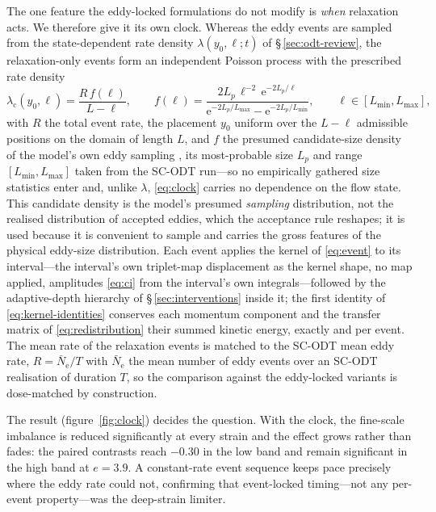 \documentclass[lineno]{JFM-FLM_Au}
\begin{document}
The one feature the eddy-locked formulations do not modify is \emph{when} relaxation acts. We therefore give it its own clock. Whereas the eddy
events are sampled from the state-dependent rate density
$\lambda(y_0,\ell;t)$ of \S\,\ref{sec:odt-review}, the relaxation-only
events form an independent Poisson process with the prescribed rate
density
\begin{equation}
  \lambda_{\mathrm c}(y_0,\ell)
  = \frac{R\,f(\ell)}{L-\ell},
  \qquad
  f(\ell)
  = \frac{2L_p\,\ell^{-2}\,\mathrm{e}^{-2L_p/\ell}}
         {\mathrm{e}^{-2L_p/L_{\max}}-\mathrm{e}^{-2L_p/L_{\min}}},
  \qquad \ell\in[L_{\min},L_{\max}],
  \label{eq:clock}
\end{equation}
with $R$ the total event rate, the placement $y_0$ uniform over the
$L-\ell$ admissible positions on the domain of length $L$, and $f$ the
presumed candidate-size density of the model's own eddy sampling
\citep{Kerstein1999,StephensLignell2021}, its most-probable size $L_p$
and range $[L_{\min},L_{\max}]$ taken from the SC-ODT run---so no
empirically gathered size statistics enter and, unlike $\lambda$,
\eqref{eq:clock} carries no dependence on the flow state. This candidate density is the model's presumed \emph{sampling} distribution, not the realised distribution of accepted eddies, which the acceptance rule reshapes; it is used because it is convenient to sample and carries the gross features of the physical eddy-size distribution. Each event applies the kernel of \eqref{eq:event} to its interval---the
interval's own triplet-map displacement as the kernel shape, no map
applied, amplitudes \eqref{eq:ci} from the interval's own
integrals---followed by the adaptive-depth hierarchy of
\S\,\ref{sec:interventions} inside it; the first identity of
\eqref{eq:kernel-identities} conserves each momentum component and
the transfer matrix of \eqref{eq:redistribution} their summed kinetic
energy, exactly and per event. The mean rate of the relaxation events is matched to the SC-ODT mean eddy rate, $R=\bar N_{\mathrm e}/T$ with $\bar N_{\mathrm e}$ the mean number of eddy events over an SC-ODT realisation of duration
$T$, so the comparison against the eddy-locked variants is
dose-matched by construction.

The result (figure~\ref{fig:clock}) decides the question. With the
clock, the fine-scale imbalance is reduced significantly at every
strain and the effect grows rather than fades: the paired contrasts
reach $-0.30$ in the low band and remain significant in the high band
at $e=3.9$. A constant-rate event sequence keeps pace precisely where the
eddy rate could not, confirming that event-locked timing---not any
per-event property---was the deep-strain limiter.
\end{document}
